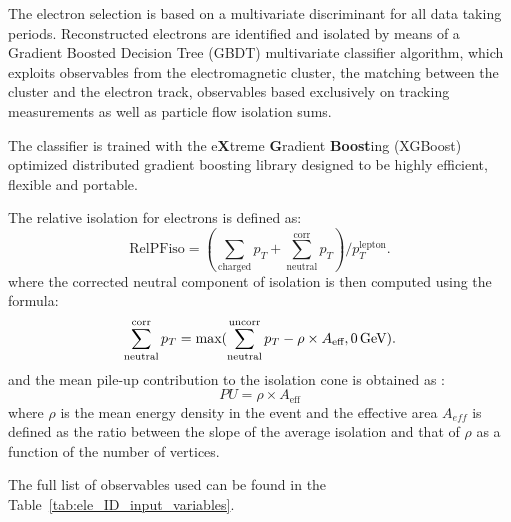 The electron selection is based on a multivariate discriminant for all data taking periods.
Reconstructed electrons are identified and isolated by means of a Gradient Boosted Decision Tree (GBDT) multivariate classifier algorithm, which exploits observables from the electromagnetic cluster, the matching between the cluster and the electron track, observables based exclusively on tracking measurements as well as particle flow isolation sums.

The classifier is trained with the e\textbf{X}treme \textbf{G}radient \textbf{Boost}ing (XGBoost) optimized distributed gradient boosting library designed to be highly efficient, flexible and portable.

The relative isolation for electrons is defined as: 
\begin{equation}
\text{RelPFiso} = (\sum_{\text{charged}} p_T + \sum^{\text{corr}}_{\text{neutral}} p_T)/p_T^{\text{lepton}}  .
\label{eqn:elepfrelisoeqn}
\end{equation} 
where the corrected neutral component of isolation is then computed using the formula:
\begin{equation}
\label{eqn:neutralea}
  \sum^{\text{corr}}_{\text{neutral}} p_T = \text{max}(\sum^{\text{uncorr}}_{\text{neutral}} p_T - \rho \times A_\text{eff},0 \,\text{Ge\hspace{-.08em}V})  .
\end{equation}
and the mean pile-up contribution to the isolation cone is obtained as :
\begin{equation}
  PU =  \rho \times A_\text{eff}
\label{eqn:purho}
\end{equation}
where $\rho$ is the mean energy density in the event and the effective area $A_{eff}$ is defined as the ratio
between the slope of the average isolation and that of $\rho$ as a function of the number of vertices.

The full list of observables used can be found in the Table~\ref{tab:ele_ID_input_variables}.

